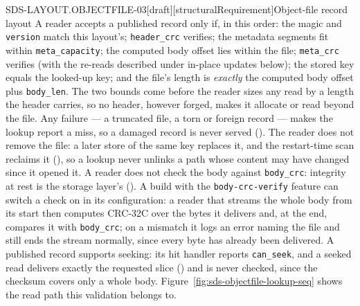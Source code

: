 \begin{requirement}{SDS-LAYOUT.OBJECTFILE-03}[draft][structuralRequirement]{Object-file record layout}
  A reader accepts a published record only if, in this order: the magic and
  \texttt{version} match this layout's; \texttt{header\_crc} verifies; the
  metadata segments fit within \texttt{meta\_capacity}; the computed body
  offset lies within the file; \texttt{meta\_crc} verifies (with the
  re-reads described under in-place updates below); the stored key equals the
  looked-up key; and the file's length is \emph{exactly} the computed body
  offset plus \texttt{body\_len}. The two bounds come before the reader
  sizes any read by a length the header carries, so no header, however
  forged, makes it allocate or read beyond the file. Any failure --- a truncated
  file, a torn or foreign record --- makes the lookup report a miss, so a
  damaged record is never served (). The
  reader does not remove the file: a later store of the same key replaces it,
  and the restart-time scan reclaims it (),
  so a lookup never unlinks a path whose content may have changed since it
  opened it. A reader does not check the body against \texttt{body\_crc}:
  integrity at rest is the storage layer's
  (). A build with the
  \texttt{body-crc-verify} feature can switch a check on in its
  configuration: a reader that streams the whole body from its start then
  computes CRC-32C over the bytes it delivers and, at the end, compares it
  with \texttt{body\_crc}; on a mismatch it logs an error naming the file and
  still ends the stream normally, since every byte has already been
  delivered. A published record supports seeking: its hit handler reports
  \texttt{can\_seek}, and a seeked read delivers exactly the requested slice
  () and is never checked, since the checksum
  covers only a whole body. Figure~\ref{fig:sds-objectfile-lookup-seq}
  shows the read path this validation belongs to.


\end{requirement}
